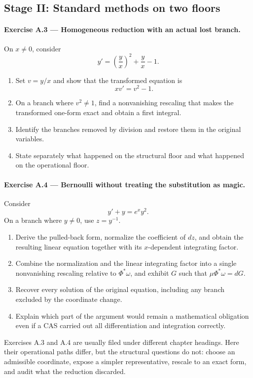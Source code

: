 \documentclass[11pt]{article}
\theoremstyle{definition}
\begin{document}
\subsection{Stage II: Standard methods on two floors}

\paragraph{Exercise A.3 --- Homogeneous reduction with an actual lost branch.}
On $x\neq0$, consider
\[
y'=\left(\frac{y}{x}\right)^2+\frac{y}{x}-1.
\]
\begin{enumerate}[label=(\alph*)]
  \item Set $v=y/x$ and show that the transformed equation is
  \[xv'=v^2-1.\]
  \item On a branch where $v^2\neq1$, find a nonvanishing rescaling that makes the transformed one-form exact and obtain a first integral.
  \item Identify the branches removed by division and restore them in the original variables.
  \item State separately what happened on the structural floor and what happened on the operational floor.
\end{enumerate}

\paragraph{Exercise A.4 --- Bernoulli without treating the substitution as magic.}
Consider
\[
y'+y=e^x y^2.
\]
On a branch where $y\neq0$, use $z=y^{-1}$.
\begin{enumerate}[label=(\alph*)]
  \item Derive the pulled-back form, normalize the coefficient of $dz$, and obtain the resulting linear equation together with its $x$-dependent integrating factor.
  \item Combine the normalization and the linear integrating factor into a single nonvanishing rescaling relative to $\Phi^*\omega$, and exhibit $G$ such that $\mu\Phi^*\omega=dG$.
  \item Recover every solution of the original equation, including any branch excluded by the coordinate change.
  \item Explain which part of the argument would remain a mathematical obligation even if a CAS carried out all differentiation and integration correctly.
\end{enumerate}

\begin{architectnote}[title={One grammar, different operational surfaces}]
Exercises A.3 and A.4 are usually filed under different chapter headings. Here their operational paths differ, but the structural questions do not: choose an admissible coordinate, expose a simpler representative, rescale to an exact form, and audit what the reduction discarded.
\end{architectnote}
\end{document}
